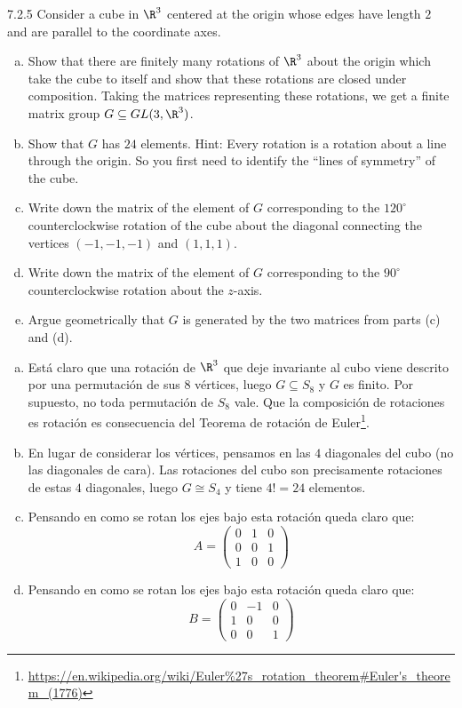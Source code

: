 \documentclass[twoside]{article}
\begin{document}
\begin{ejercicio}{7.2.5}
Consider a cube in $\R^3$ centered at the origin whose edges have length $2$ and are parallel to the coordinate axes.
\begin{enumerate}[a.]
\item Show that there are finitely many rotations of $\R^3$ about the origin which take the cube to itself and show that these rotations are closed under composition.
Taking the matrices representing these rotations, we get a finite matrix group $G \subseteq GL(3, \R^3)$.
\item Show that $G$ has $24$ elements.
Hint: Every rotation is a rotation about a line through the origin.
So you first need to identify the “lines of symmetry” of the cube. 
\item Write down the matrix of the element of $G$ corresponding to the $120^{\circ}$ counterclockwise rotation of the cube about the diagonal connecting the vertices $(-1, -1, -1)$ and $(1, 1, 1)$. 
\item Write down the matrix of the element of $G$ corresponding to the $90^{\circ}$ counterclockwise rotation about the $z$-axis.
\item Argue geometrically that $G$ is generated by the two matrices from parts (c) and (d).
\end{enumerate}
\end{ejercicio}
\begin{solucion}
\begin{enumerate}[a.]
\item Está claro que una rotación de $\R^3$ que deje invariante al cubo viene descrito por una permutación de sus $8$ vértices, luego $G \subseteq S_8$ y $G$ es finito.
Por supuesto, no toda permutación de $S_8$ vale.
Que la composición de rotaciones es rotación es consecuencia del Teorema de rotación de Euler\footnote{\url{https://en.wikipedia.org/wiki/Euler\%27s_rotation_theorem\#Euler's_theorem_(1776)}}.

\item En lugar de considerar los vértices, pensamos en las $4$ diagonales del cubo (no las diagonales de cara).
Las rotaciones del cubo son precisamente rotaciones de estas $4$ diagonales, luego $G \cong S_4$ y tiene $4!=24$ elementos.

\item Pensando en como se rotan los ejes bajo esta rotación queda claro que:
\[ A = \begin{pmatrix}0 & 1 & 0\\0 & 0 & 1\\1 & 0 & 0\end{pmatrix} \]

\item Pensando en como se rotan los ejes bajo esta rotación queda claro que:
\[ B = \begin{pmatrix}0 & -1 & 0\\1 & 0 & 0\\0 & 0 & 1\end{pmatrix} \]

\end{enumerate}
\end{solucion}
\newpage
\end{document}
